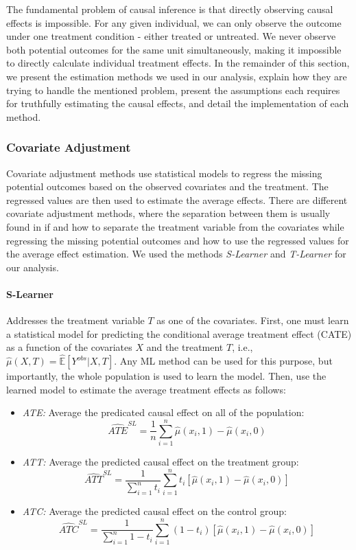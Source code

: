 \documentclass{article}
\begin{document}
The fundamental problem of causal inference is that directly observing causal effects is impossible. For any given individual, we can only observe the outcome under one treatment condition - either treated or untreated. We never observe both potential outcomes for the same unit simultaneously, making it impossible to directly calculate individual treatment effects. In the remainder of this section, we present the estimation methods we used in our analysis, explain how they are trying to handle the mentioned problem, present the assumptions each requires for truthfully estimating the causal effects, and detail the implementation of each method.

\subsubsection{Covariate Adjustment}
Covariate adjustment methods use statistical models to regress the missing potential outcomes based on the observed covariates and the treatment. The regressed values are then used to estimate the average effects.
There are different covariate adjustment methods, where the separation between them is usually found in if and how to separate the treatment variable from the covariates while regressing the missing potential outcomes and how to use the regressed values for the average effect estimation. We used the methods \emph{S-Learner} and \emph{T-Learner} for our analysis.
\paragraph{S-Learner} Addresses the treatment variable $T$ as one of the covariates. First, one must learn a statistical model for predicting the conditional average treatment effect (CATE) as a function of the covariates $X$ and the treatment $T$, i.e., $\hat{\mu}(X, T) = \hat{\mathbb{E}}[Y^{obs} | X, T]$. Any ML method can be used for this purpose, but importantly, the whole population is used to learn the model. Then, use the learned model to estimate the average treatment effects as follows:

\begin{itemize}
    \item \textit{ATE:} Average the predicated causal effect on all of the population:
    \[
    \widehat{ATE}^{SL} = \frac{1}{n} \sum_{i=1}^{n} \hat{\mu}(x_i, 1) - \hat{\mu}(x_i, 0)
    \]
    \item \textit{ATT:} Average the predicted causal effect on the treatment group:
    \[
    \widehat{ATT}^{SL} = \frac{1}{\sum_{i=1}^{n} t_i} \sum_{i=1}^{n} t_i \left[ \hat{\mu}(x_i, 1) - \hat{\mu}(x_i, 0) \right] 
    \]
    \item \textit{ATC:} Average the predicted causal effect on the control group:
    \[
    \widehat{ATC}^{SL} = \frac{1}{\sum_{i=1}^{n} 1 - t_i} \sum_{i=1}^{n} (1 - t_i) \left[ \hat{\mu}(x_i, 1) - \hat{\mu}(x_i, 0) \right]
    \]
\end{itemize}
\end{document}
